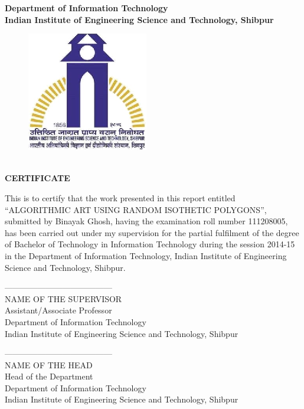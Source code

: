 \documentclass[12pt]{article}
\begin{document}
\newpage




\thispagestyle{empty}
\begin{center}
  \large \textbf{Department of Information Technology\\
  Indian Institute of Engineering Science and Technology, Shibpur}
\begin{figure}
  \centering
  \includegraphics[scale=1]{Logo_IIEST.eps}\\
\end{figure}
\\
 \vspace{1cm}
 \huge \textbf{CERTIFICATE}
 \vspace{1cm}
\end{center}
This is to certify that the work presented in this report entitled ``ALGORITHMIC ART USING RANDOM ISOTHETIC POLYGONS'', submitted by Binayak Ghosh, having the examination roll number 111208005, has been carried out under my supervision for the partial fulfilment of the degree of Bachelor of Technology in Information Technology during the session 2014-15 in the Department of Information Technology, Indian Institute of Engineering Science and Technology, Shibpur.\\
\vspace{1.5cm}

\begin{minipage}[t]{0.48\linewidth}
\begin{flushleft}
---------------------------------------\\
NAME OF THE SUPERVISOR\\
Assistant/Associate Professor\\
Department of Information Technology\\
Indian Institute of Engineering Science and Technology, Shibpur
\end{flushleft}
\end{minipage}\hfill
\begin{minipage}[t]{0.48\linewidth}
\begin{flushright}
---------------------------------------\\
NAME OF THE HEAD\\
Head of the Department\\
Department of Information Technology\\
Indian Institute of Engineering Science and Technology, Shibpur
\end{flushright}
\end{minipage}
\vspace{1.5cm}
\end{document}
